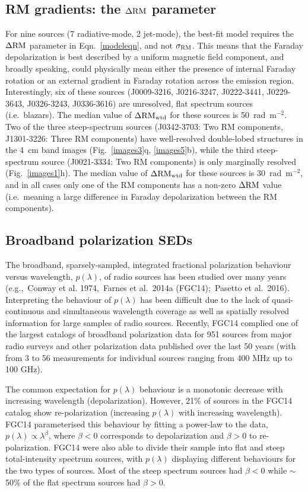 \documentclass{mnras}
\newcommand*\sigmaRM{\sigma_{\rm RM}}
\newcommand*\gradRMwtd{\Delta{\rm RM_{wtd}}}
\newcommand*\DeltaRM{\Delta{\rm RM}}
\begin{document}
\subsection{RM gradients: the $\DeltaRM$ parameter}
For nine sources (7 radiative-mode, 2 jet-mode), the best-fit model requires the $\DeltaRM$ parameter in Eqn.~\ref{modeleqn}, and not $\sigmaRM$. This means that the Faraday depolarization is best described by a uniform magnetic field component, and broadly speaking, could physically mean either the presence of internal Faraday rotation or an external gradient in Faraday rotation across the emission region. Interestingly, six of these sources (J0009-3216, J0216-3247, J0222-3441, J0229-3643, J0326-3243, J0336-3616) are unresolved, flat spectrum sources (i.e.~blazars). The median value of $\gradRMwtd$ for these sources is 50~rad~m$^{-2}$.
Two of the three steep-spectrum sources (J0342-3703: Two RM components, J1301-3226: Three RM components) have well-resolved double-lobed structures in the 4~cm band images (Fig.~\ref{images3}q, \ref{images5}b), while the third steep-spectrum source (J0021-3334: Two RM components) is only marginally resolved (Fig.~\ref{images1}h). The median value of $\gradRMwtd$ for these sources is 30~rad~m$^{-2}$, and in all cases only one of the RM components has a non-zero $\DeltaRM$ value (i.e.~meaning a large difference in Faraday depolarization between the RM components). 

\subsection{Broadband polarization SEDs}

The broadband, sparsely-sampled, integrated fractional polarization behaviour versus wavelength, $p(\lambda)$, of radio sources has been studied over many years (e.g.,~Conway et al. 1974,~Farnes et al.~2014a (FGC14);~Pasetto et al.~2016). Interpreting the behaviour of $p(\lambda)$ has been difficult due to the lack of quasi-continuous and simultaneous wavelength coverage as well as spatially resolved information for large samples of radio sources. Recently, FGC14 complied one of the largest catalogs of broadband polarization data for 951 sources from major radio surveys and other polarization data published over the last 50 years (with from 3 to 56 measurements for individual sources ranging from 400 MHz up to 100 GHz). 

The common expectation for $p(\lambda)$ behaviour is a monotonic decrease with increasing wavelength (depolarization). However, 21\% of sources in the FGC14 catalog show re-polarization (increasing $p(\lambda)$ with increasing wavelength). FGC14 parameterised this behaviour by fitting a power-law to the data, $p(\lambda)\propto\lambda^\beta$, where $\beta < 0$ corresponds to depolarization and $\beta > 0$ to re-polarization. 
FGC14 were also able to divide their sample into flat and steep total-intensity spectrum sources, with $p(\lambda)$ displaying different behaviours for the two types of sources. Most of the steep spectrum sources had $\beta < 0$ while $\sim$50\% of the flat spectrum sources had $\beta >0$. 
\end{document}
